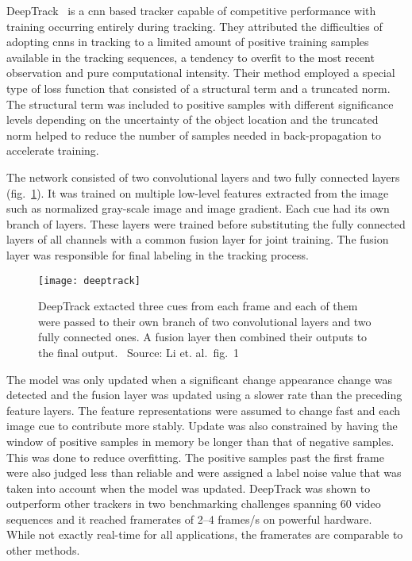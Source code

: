 DeepTrack~\cite{DEEPTRACK} is a \ac{cnn} based tracker capable of competitive performance
with training occurring entirely during tracking. They attributed the difficulties of
adopting \ac{cnn}s in tracking to a limited amount of positive training samples available
in the tracking sequences, a tendency to overfit to the most recent observation and pure
computational intensity. Their method employed a special type of loss function that
consisted of a structural term and a truncated norm. The structural term was included
to positive samples with different significance levels depending on the uncertainty of
the object location and the truncated norm helped to reduce the number of samples needed
in back-propagation to accelerate training.~\cite{DEEPTRACK}

The network consisted of two convolutional layers and two fully connected layers (fig.~\ref{fig:deeptrack}).
It was trained on multiple low-level features extracted from the image such as normalized
gray-scale image and image gradient. Each cue had its own branch of layers. These
layers were trained before substituting the fully connected layers of all channels
with a common fusion layer for joint training. The fusion layer was responsible for
final labeling in the tracking process.~\cite{DEEPTRACK}

\begin{figure}[H]
\centering
\texttt{[image: deeptrack]}
\caption{DeepTrack extacted three cues from each frame and each of them were passed
         to their own branch of two convolutional layers and two fully connected ones.
         A fusion layer then combined their outputs to the final output.~\cite{DEEPTRACK} Source: Li et.
         al.~fig.~1~\cite{DEEPTRACK}}\label{fig:deeptrack}
\end{figure}

The model was only updated when a significant change appearance change was detected
and the fusion layer was updated using a slower rate than the preceding feature layers.
The feature representations were assumed to change fast and each image cue to contribute
more stably. Update was also constrained by having the window of positive samples in
memory be longer than that of negative samples. This was done to reduce overfitting.
The positive samples past the first frame were also judged less than reliable and
were assigned a label noise value that was taken into account when the model was updated.
DeepTrack was shown to outperform other trackers in two benchmarking challenges
spanning 60 video sequences and it reached framerates of 2--4 frames/s on powerful
hardware.~\cite{DEEPTRACK} While not exactly real-time for all applications, the framerates are comparable
to other methods.

